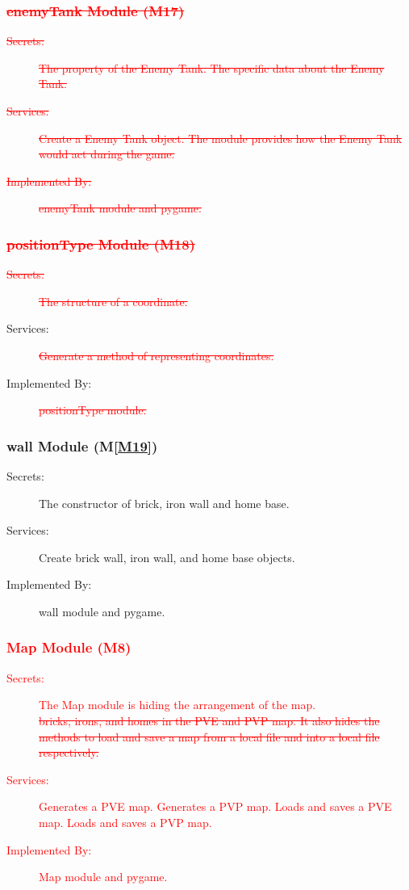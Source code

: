 \documentclass[12pt, titlepage]{article}
\DeclareRobustCommand{\hsout}[1]{\texorpdfstring{\sout{#1}}{#1}}
\newcommand{\mref}[1]{M\ref{#1}}
\begin{document}
\subsubsection{\textcolor{red}{\hsout{enemyTank Module  (M17)}}}
\begin{description}
\item[\textcolor{red}{\sout{Secrets:}}]\textcolor{red}{\sout{The property of the Enemy Tank. The specific data about the Enemy Tank.}}
\item[\textcolor{red}{\sout{Services:}}] \textcolor{red}{\sout{Create a Enemy Tank object. The module provides how the Enemy Tank would act during the game.}}
\item[\textcolor{red}{\sout{Implemented By:}}] \textcolor{red}{\sout{enemyTank module and pygame.}}
\end{description}

\subsubsection{\textcolor{red}{\hsout{positionType Module (M18)}}}
\begin{description}
\item[\textcolor{red}{\sout{Secrets:}}] \textcolor{red}{\sout{The structure of a coordinate.}}
\item[Services:] \textcolor{red}{\sout{Generate a method of representing coordinates.}}
\item[Implemented By:] \textcolor{red}{\sout{positionType module.}}
\end{description}

\subsubsection{wall Module (\mref{M19})}
\begin{description}
\item[Secrets:] The constructor of brick, iron wall and home base.
\item[Services:] Create brick wall, iron wall, and home base objects.
\item[Implemented By:] wall module and pygame.
\end{description}

\subsubsection{\textcolor{red}{Map Module (M8)}}
\begin{description}
\item[\textcolor{red}{Secrets:}] \textcolor{red}{The Map module is hiding the arrangement of the map. \\ \sout{bricks, irons, and homes in the PVE and PVP map. It also hides the methods to load and save a map from a local file and into a local file respectively.}}
\item[\textcolor{red}{Services:}] \textcolor{red}{Generates a PVE map. Generates a PVP map. Loads and saves a PVE map. Loads and saves a PVP map.}
\item[\textcolor{red}{Implemented By:}] \textcolor{red}{Map module and pygame.}
\end{description}
\end{document}
